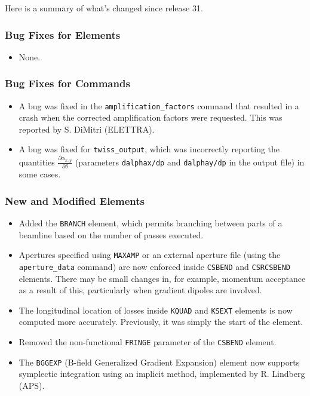 \documentclass[11pt]{article}
\begin{document}
Here is a summary of what's changed since release 31.

\subsubsection{Bug Fixes for Elements}

\begin{itemize}
\item None.
\end{itemize}

\subsubsection{Bug Fixes for Commands}
\begin{itemize}
\item A bug was fixed in the \verb|amplification_factors| command that resulted in a crash when the corrected amplification
  factors were requested. This was reported by S. DiMitri (ELETTRA).
\item A bug was fixed for \verb|twiss_output|, which was incorrectly reporting the quantities $\frac{\partial \alpha_{x,y}}{\partial \delta}$
 (parameters \verb|dalphax/dp| and \verb|dalphay/dp| in the output file) in some cases.
\end{itemize}

\subsubsection{New and Modified Elements}
\begin{itemize}
\item Added the \verb|BRANCH| element, which permits branching between parts of a beamline based on the number of passes executed.
\item Apertures specified using \verb|MAXAMP| or an external aperture file (using the \verb|aperture_data| command) are now
  enforced inside \verb|CSBEND| and \verb|CSRCSBEND| elements.
  There may be small changes in, for example, momentum acceptance as a result of this, particularly when gradient dipoles are involved. 
\item The longitudinal location of losses inside \verb|KQUAD| and \verb|KSEXT| elements is now computed more accurately. Previously,
  it was simply the start of the element.
\item Removed the non-functional \verb|FRINGE| parameter of the \verb|CSBEND| element.
\item The \verb|BGGEXP| (B-field Generalized Gradient Expansion) element now supports symplectic integration using an
  implicit method, implemented by R. Lindberg (APS).
\end{itemize}
\end{document}
